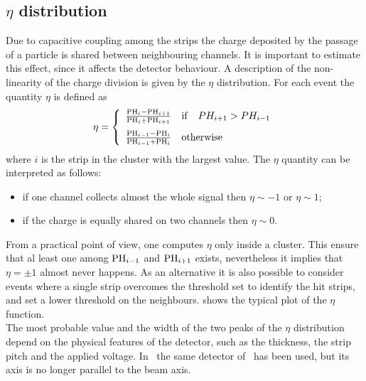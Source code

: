 \subsection{$\eta$ distribution}\label{sect:eta}
Due to capacitive coupling among the strips the charge deposited by the passage
of a particle is shared between neighbouring channels. It is important to
estimate this effect, since it affects the detector behaviour. A
description of the non-linearity of the charge division is given by the $\eta$
distribution. For each event the quantity $\eta$ is defined as
\begin{equation}
\begin{displaystyle}
  \eta = \left\{
  \begin{array}{ll}
    \frac{{\rm PH}_i-{\rm PH}_{i+1}}{{\rm PH}_i+{\rm PH}_{i+1}} & {\rm if}\quad PH_{i+1} > PH_{i-1}\\[8pt]
    \frac{{\rm PH}_{i-1}-{\rm PH}_{i}}{{\rm PH}_{i-1}+{\rm PH}_{i}} & {\rm otherwise}
  \end{array}
\right.
\end{displaystyle}
\end{equation}
where $i$ is the strip in the cluster with the largest value. The $\eta$ quantity can
be interpreted as follows:
\begin{itemize}
\item if one channel collects almost the whole
signal then $\eta \sim -1$ or $\eta \sim 1$;
\item if the charge is equally shared on two channels then $\eta \sim 0$.
\end{itemize}
From a practical point of view, one computes $\eta$ only inside a cluster. This
ensure that al least one among ${\rm PH}_{i-1}$ and ${\rm PH}_{i+1}$ exists,
nevertheless it implies that $\eta = \pm 1$ almost never happens. As an
alternative it is also possible to consider events where a single strip
overcomes the threshold set to identify the hit strips, and set a lower
threshold on the neighbours.  shows the typical plot of the
$\eta$ function.\\
The most probable value and the width of the two peaks of the $\eta$
distribution depend on the physical features of the detector, such as the
thickness, the strip pitch and the applied voltage. In~ the
same detector of~ has been used, but its axis is no longer
parallel to the beam axis.\\
